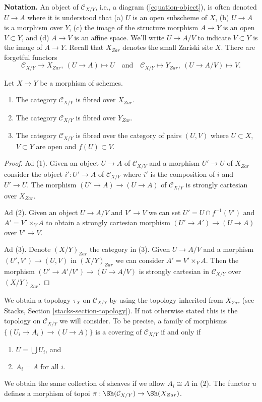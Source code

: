\medskip\noindent
{\bf Notation.} An object of $\mathcal{C}_{X/Y}$, i.e., a diagram
(\ref{equation-object}), is often denoted $U \to A$ where it is
understood that (a) $U$ is an open subscheme of $X$, (b)
$U \to A$ is a morphism over $Y$, (c) the image of the
structure morphism $A \to Y$ is an open $V \subset Y$, and (d)
$A \to V$ is an affine space. We'll write $U \to A/V$ to indicate
$V \subset Y$ is the image of $A \to Y$.
Recall that $X_{Zar}$ denotes the small Zariski site $X$.
There are forgetful functors
$$
\mathcal{C}_{X/Y} \to X_{Zar},\ (U \to A) \mapsto U
\quad\text{and}\quad
\mathcal{C}_{X/Y} \mapsto Y_{Zar},\ (U \to A/V) \mapsto V.
$$

\begin{lemma}
\label{lemma-category-fibred}
Let $X \to Y$ be a morphism of schemes.
\begin{enumerate}
\item The category $\mathcal{C}_{X/Y}$ is fibred over $X_{Zar}$.
\item The category $\mathcal{C}_{X/Y}$ is fibred over $Y_{Zar}$.
\item The category $\mathcal{C}_{X/Y}$ is fibred over the
category of pairs $(U, V)$ where $U \subset X$, $V \subset Y$ are
open and $f(U) \subset V$.
\end{enumerate}
\end{lemma}

\begin{proof}
Ad (1). Given an object $U \to A$ of $\mathcal{C}_{X/Y}$ and a morphism
$U' \to U$ of $X_{Zar}$ consider the object $i' : U' \to A$ of
$\mathcal{C}_{X/Y}$ where $i'$ is the composition of $i$ and $U' \to U$.
The morphism $(U' \to A) \to (U \to A)$ of $\mathcal{C}_{X/Y}$
is strongly cartesian over $X_{Zar}$.

\medskip\noindent
Ad (2). Given an object $U \to A/V$ and $V' \to V$ we can set
$U' = U \cap f^{-1}(V')$ and $A' = V' \times_V A$ to obtain a strongly
cartesian morphism $(U' \to A') \to (U \to A)$ over $V' \to V$.

\medskip\noindent
Ad (3). Denote $(X/Y)_{Zar}$ the category in (3). Given $U \to A/V$
and a morphism $(U', V') \to (U, V)$ in $(X/Y)_{Zar}$ we can consider
$A' = V' \times_V A$. Then the morphism $(U' \to A'/V') \to (U \to A/V)$
is strongly cartesian in $\mathcal{C}_{X/Y}$ over $(X/Y)_{Zar}$.
\end{proof}

\noindent
We obtain a topology $\tau_X$ on $\mathcal{C}_{X/Y}$ by
using the topology inherited from $X_{Zar}$ (see
Stacks, Section \ref{stacks-section-topology}). If not otherwise
stated this is the topology on $\mathcal{C}_{X/Y}$ we will consider.
To be precise, a family of morphisms $\{(U_i \to A_i) \to (U \to A)\}$
is a covering of $\mathcal{C}_{X/Y}$ if and only if
\begin{enumerate}
\item $U = \bigcup U_i$, and
\item $A_i = A$ for all $i$.
\end{enumerate}
We obtain the same collection of sheaves if we allow $A_i \cong A$ in (2).
The functor $u$ defines a morphism of topoi
$\pi : \Sh(\mathcal{C}_{X/Y}) \to \Sh(X_{Zar})$.

